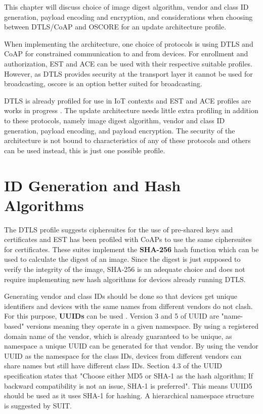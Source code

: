 \documentclass[0-thesis.tex]{subfiles}
\begin{document}
\label{chap:profiles}
This chapter will discuss choice of image digest algorithm, vendor and class ID
generation, payload encoding and encryption, and considerations when choosing between
DTLS/CoAP and OSCORE for an update architecture profile.

When implementing the architecture, one choice of protocols is using DTLS and CoAP for
constrained communication to and from devices. For enrollment and authorization, EST and
ACE can be used with their respective suitable profiles. However, as DTLS provides
security at the transport layer it cannot be used for broadcasting, \gls{oscore} is an
option better suited for broadcasting. 

DTLS is already profiled for use in IoT contexts and EST and ACE profiles are works in
progress \parencite{rfc7925, est-coaps, ace-dtls-profile}. The update architecture needs
little extra profiling in addition to these protocols, namely image digest algorithm,
vendor and class ID generation, payload encoding, and payload encryption. The security of
the architecture is not bound to characteristics of any of these protocols and others can
be used instead, this is just one possible profile.

\section{ID Generation and Hash Algorithms}
\label{sec:hash-id-algorithm}
The DTLS profile suggests ciphersuites for the use of pre-shared keys and certificates and
EST has been profiled with CoAPs to use the same ciphersuites for certificates. These
suites implement the \textbf{SHA-256} hash function which can be used to calculate the
digest of an image. Since the digest is just supposed to verify the integrity of the
image, SHA-256 is an adequate choice and does not require implementing new hash algorithms
for devices already running DTLS.

Generating vendor and class IDs should be done so that devices get unique identifiers and
devices with the same names from different vendors do not clash. For this purpose,
\textbf{UUIDs} can be used \parencite{rfc4122}. Version 3 and 5 of UUID are "name-based"
versions meaning they operate in a given namespace. By using a registered domain name of
the vendor, which is already guaranteed to be unique, as namespace a unique UUID can be
generated for that vendor. By using the vendor UUID as the namespace for the class IDs,
devices from different vendors can share names but still have different class IDs. Section
4.3 of the UUID specification states that "Choose either MD5 or SHA-1 as the hash
algorithm; If backward compatibility is not an issue, SHA-1 is preferred". This means
UUID5 should be used as it uses SHA-1 for hashing. A hierarchical namespace structure is
suggested by SUIT.
\end{document}
